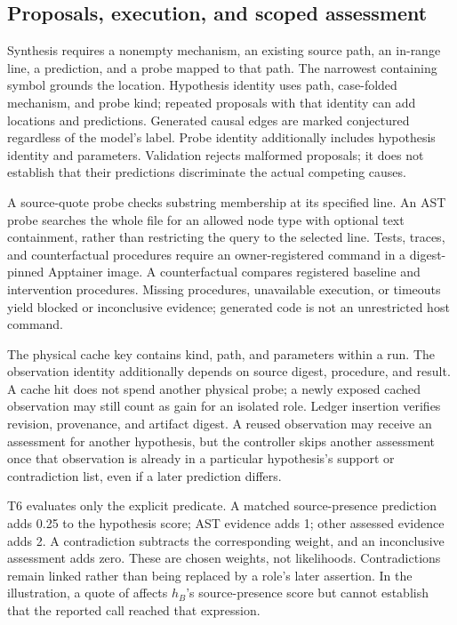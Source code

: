\documentclass[letterpaper,journal]{IEEEtran}
\newcommand{\code}[1]{\texttt{\detokenize{#1}}}
\begin{document}
\subsection{Proposals, execution, and scoped assessment}\label{sec:probes}
Synthesis requires a nonempty mechanism, an existing source path, an in-range line, a prediction, and a probe mapped to that path. The narrowest containing symbol grounds the location. Hypothesis identity uses path, case-folded mechanism, and probe kind; repeated proposals with that identity can add locations and predictions. Generated causal edges are marked conjectured regardless of the model's label. Probe identity additionally includes hypothesis identity and parameters. Validation rejects malformed proposals; it does not establish that their predictions discriminate the actual competing causes.

A source-quote probe checks substring membership at its specified line. An AST probe searches the whole file for an allowed node type with optional text containment, rather than restricting the query to the selected line. Tests, traces, and counterfactual procedures require an owner-registered command in a digest-pinned Apptainer image. A counterfactual compares registered baseline and intervention procedures. Missing procedures, unavailable execution, or timeouts yield blocked or inconclusive evidence; generated code is not an unrestricted host command.

The physical cache key contains kind, path, and parameters within a run. The observation identity additionally depends on source digest, procedure, and result. A cache hit does not spend another physical probe; a newly exposed cached observation may still count as gain for an isolated role. Ledger insertion verifies revision, provenance, and artifact digest. A reused observation may receive an assessment for another hypothesis, but the controller skips another assessment once that observation is already in a particular hypothesis's support or contradiction list, even if a later prediction differs.

T6 evaluates only the explicit predicate. A matched source-presence prediction adds 0.25 to the hypothesis score; AST evidence adds 1; other assessed evidence adds 2. A contradiction subtracts the corresponding weight, and an inconclusive assessment adds zero. These are chosen weights, not likelihoods. Contradictions remain linked rather than being replaced by a role's later assertion. In the illustration, a quote of \code{or True} affects $h_B$'s source-presence score but cannot establish that the reported call reached that expression.
\end{document}
